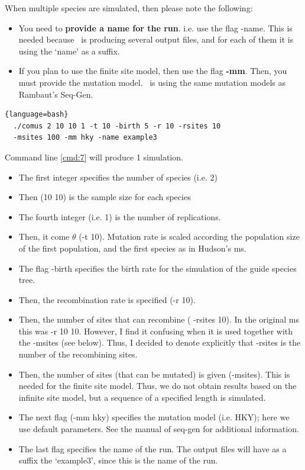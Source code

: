 When multiple species are simulated, then please note the following:
\begin{itemize}
\item You need to {\bf provide a name for the run}. i.e. use the flag -name. This is needed because \comus\ is producing several output files, and for each of them it is using the `name' as a suffix. 
\item If you plan to use the finite site model, then use the flag {\bf -mm}. Then, you must provide the mutation model. \comus\ is using the same mutation models as Rambaut's Seq-Gen.
\end{itemize}

\begin{lstlisting}[label=cmd:7, caption={Two species, random phylogenetic tree}]{language=bash}
  ./comus 2 10 10 1 -t 10 -birth 5 -r 10 -rsites 10 
  -msites 100 -mm hky -name example3
\end{lstlisting}

Command line \ref{cmd:7} will produce 1 simulation. 
\begin{itemize}
\item The first integer specifies the number of species (i.e. 2)
\item Then (10 10) is the sample size for each species
\item The fourth integer (i.e. 1) is the number of replications. 
\item Then, it come $\theta$ (-t 10). Mutation rate is scaled according the population size of the first population, and the first species as in Hudson's ms. 
\item The flag -birth specifies the birth rate for the simulation of the guide species tree.
\item Then, the recombination rate is specified (-r 10). 
\item Then, the number of sites that can recombine ( -rsites 10). In the original ms this was -r 10 10. However, I find it confusing when it is used together with the -msites (see below). Thus, I decided to denote explicitly that -rsites is the number of the recombining sites. 
\item Then, the number of sites (that can be mutated) is given (-msites). This is needed for the finite site model. Thus, we do not obtain results based on the infinite site model, but a sequence of a specified length is simulated. 
\item The next flag (-mm hky) specifies the mutation model (i.e. HKY); here we use default parameters. See the manual of seq-gen for additional information. 
\item The last flag specifies the name of the run. The output files will have as a suffix the `example3', since this is the name of the run. 
\end{itemize}


